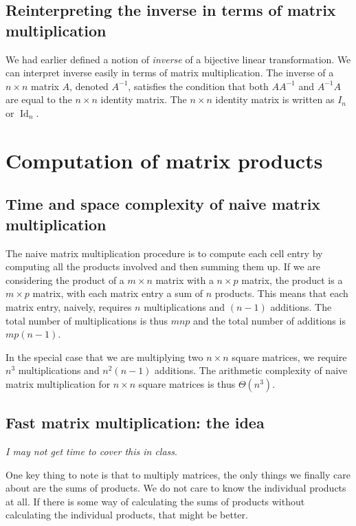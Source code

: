 \documentclass[10pt]{amsart}
\begin{document}
\subsection{Reinterpreting the inverse in terms of matrix multiplication}

We had earlier defined a notion of {\em inverse} of a bijective linear
transformation. We can interpret inverse easily in terms of matrix
multiplication. The inverse of a $n \times n$ matrix $A$, denoted
$A^{-1}$, satisfies the condition that both $AA^{-1}$ and $A^{-1}A$
are equal to the $n \times n$ identity matrix. The $n \times n$
identity matrix is written as $I_n$ or $\operatorname{Id}_n$.

\section{Computation of matrix products}

\subsection{Time and space complexity of naive matrix multiplication}

The naive matrix multiplication procedure is to compute each cell
entry by computing all the products involved and then summing them
up. If we are considering the product of a $m \times n$ matrix with a
$n \times p$ matrix, the product is a $m \times p$ matrix, with each
matrix entry a sum of $n$ products. This means that each matrix entry,
naively, requires $n$ multiplications and $(n - 1)$ additions. The
total number of multiplications is thus $mnp$ and the total number of
additions is $mp(n - 1)$.

In the special case that we are multiplying two $n \times n$ square
matrices, we require $n^3$ multiplications and $n^2(n - 1)$
additions. The arithmetic complexity of naive matrix multiplication
for $n \times n$ square matrices is thus $\Theta(n^3)$.

\subsection{Fast matrix multiplication: the idea}

{\em I may not get time to cover this in class}.

One key thing to note is that to multiply matrices, the only things we
finally care about are the sums of products. We do not care to know
the individual products at all. If there is some way of calculating
the sums of products without calculating the individual products, that
might be better.
\end{document}
